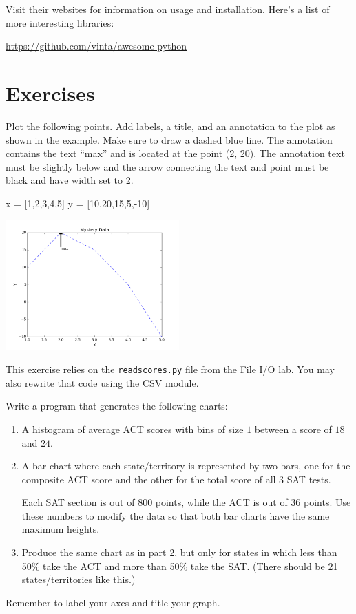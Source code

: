 \documentclass[11pt]{cselabheader}
\begin{document}
Visit their websites for information on usage and installation.
Here's a list of more interesting libraries:
\begin{center}
\url{https://github.com/vinta/awesome-python}
\end{center}

\newpage
\section{Exercises}
\begin{ex}[plotpoints.py]
Plot the following points. Add labels, a title, and an annotation to the plot
as shown in the example. Make sure to draw a dashed blue line.
The annotation contains the text ``max'' and is located at the point (2, 20).
The annotation text must be slightly below and the arrow connecting the text
and point must be black and have width set to 2.

\begin{python3code}
x = [1,2,3,4,5]
y = [10,20,15,5,-10]
\end{python3code}

\begin{center}
\includegraphics[width=0.5\textwidth]{img/basic.png}
\end{center}
\end{ex}

\begin{ex}[plotscores.py]
  This exercise relies on the \texttt{readscores.py} file from the File I/O
  lab. You may also rewrite that code using the CSV module.

  Write a program that generates the following charts:
  \begin{enumerate}
    \item A histogram of average ACT scores with bins of size $1$ between a
      score of $18$ and $24$.
    \item A bar chart where each state/territory is represented by two
      bars, one for the composite ACT score and the other for the total
      score of all 3 SAT tests.

      Each SAT section is out of 800 points, while the ACT is out of
      36 points.  Use these numbers to modify the data so that both bar
      charts have the same maximum heights.
    \item Produce the same chart as in part 2, but only for states in which
      less than 50\% take the ACT and more than 50\% take the SAT. (There
      should be 21 states/territories like this.)
  \end{enumerate}

  Remember to label your axes and title your graph.
\end{ex}
\end{document}
